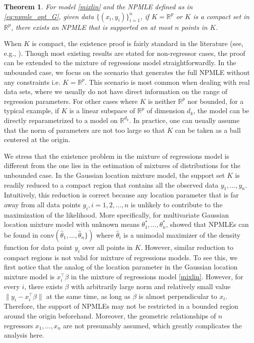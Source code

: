 \documentclass[11pt]{article}
\numberwithin{equation}{section}
\newtheorem{theorem}{Theorem}[section]
\newcommand{\RS}{\mathbb{R}}
\newcommand{\T}{ \top }
\begin{document}
\begin{theorem}
For model \eqref{mixlin} and the NPMLE defined as in \eqref{eq:npmle_opt_G}, given data $\{ (x_i,y_i)\}_{i=1}^n$, if $K = \RS^p$ or $K$ is a compact set in $\RS^p$, there exists an NPMLE that is supported on at most $n$ points in $K$.
\label{thm:existencethm}
\end{theorem}

When $K$ is compact, the existence proof is fairly standard in the literature (see, e.g., \citet{lindsay1983geometrya}). Though most existing results are stated for non-regressor cases, the proof can be extended to the mixture of regressions model straightforwardly. In the unbounded case, we focus on the scenario that generates the full NPMLE without any constraints i.e. $K = \RS^p$. This scenario is most common when dealing with real data sets, where we usually do not have direct information on the range of regression parameters. For other cases where $K$ is neither $\RS^p$ nor bounded, for a typical example, if $K$ is a linear subspace of $\RS^p$ of dimension $d_k$, the model can be directly reparametrized to a  model on $\RS^{d_k}$. In practice, one can usually assume that the norm of parameters are not too large so that $K$ can be taken as a ball centered at the origin.

We stress that the existence problem in the mixture of regressions model is different from the one lies in the estimation of mixtures of distributions for the unbounded case. In the Gaussian location mixture model, the support set $K$ is readily reduced to a compact region that contains all the observed data $y_1,\dots,y_n$. Intuitively, this reduction is correct because any location parameter that is far away from all data points $y_i, i = 1,2,\dots, n$ is unlikely to contribute to the maximization of the likelihood. More specifically, for multivariate Gaussian location mixture model with unknown means $\theta^*_1, \dots, \theta^*_n$, \citet[Proposition 1]{feng2018approximate} showed that NPMLEs can be found in  $\mathrm{conv}(\hat{\theta}_1, \dots, \hat{\theta}_n\})$ where $\hat{\theta}_i$ is a unimodal maximizer of the density function for data point $y_i$ over all points in $K$.  However, similar reduction to compact regions is not valid for mixture of regressions models. To see this, we first notice that the analog of the location parameter in the Gaussian location mixture model is $x_i^\T \beta$ in the mixture of regressions model \eqref{mixlin}. However, for every $i$, there exists $\beta$ with arbitrarily large norm and relatively small value $\| y_i - x_i^\T \beta \| $ at the same time, as long as $\beta$ is almost perpendicular to $x_i$. Therefore, the support of NPMLEs may not be restricted in a bounded region around the origin beforehand. Moreover, the geometric relationships of $n$ regressors $x_1,\dots,x_n$ are not presumably assumed, which greatly complicates the analysis here. 
\end{document}
